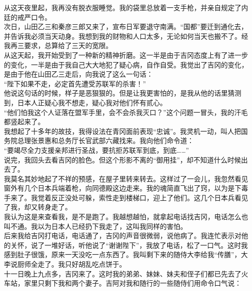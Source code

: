从这天夜里起，我再没有脱衣服睡觉。我的袋里总放着一支手枪，并亲自规定了内廷的戒严口令。\\

次日，山田乙三和秦彦三郎又来了，宣布日军要退守南满。“国都”要迁到通化去，并告诉我必须当天动身。我想到我的财物和人口太多，无论如何当天也搬不了。经我再三要求，总算给了三天的宽限。\\

从这天起，我开始受到了一种新的精神折磨。这一半是由于吉冈态度上有了进一步的变化，一半是由于我自己大大地犯了疑心病，自作自受。我觉出了吉冈的变化，是由于他在山田乙三走后，向我说了这么一句话：\\

“陛下如果不走，必定首先遭受苏联军的杀害！”\\

他说这句话的时候，样子是恶狠狠的。但是让我更害怕的，是我从他的话里猜测到，日本人正疑心我不想走，疑心我对他们怀有贰心。\\

“他们怕我这个人证落在盟军手里，会不会杀我灭口？”这个问题一冒头，我的汗毛都竖起来了。\\

我想起了十多年的故技，我得设法在青冈面前表现“忠诚”。我灵机一动，叫人把国务院总理张景惠和总务厅长官武部六藏找来。我向他们命令道：\\

“要竭尽全力支援亲邦进行圣战，要抗拒苏联军到底，到底……”\\

说完，我回头去看吉冈的脸色。但这个形影不离的“御用挂”，却不知道什么时候出去了。\\

我莫名其妙地起了不祥的预感，在屋子里转来转去。这样过了一会儿，我忽然看见窗外有几个日本兵端着枪，向同德殿这边走来。我的魂简直飞出了窍，以为是下毒手来了。我觉着反正没处可躲，索性走到楼梯口，迎上了他们。这几个日本兵看见了我，却又转身走了。\\

我认为这是来查看我，是不是跑了。我越想越怕，就拿起电话找吉冈，电话怎么也叫不通。我以为日本人已经扔下我走了，这叫我同样的害怕。\\

后来我给吉冈打电话，电话通了，吉冈的声音很微弱，说他病了。我连忙表示对他的关怀，说了一堆好话，听他说了“谢谢陛下”，我放了电话，松了一口气。这时我感到肚子很饿，原来一天没吃一点东西了。我叫剩下来的随侍大李给我“传膳”，大李说厨师全走了。我只好胡乱吃点饼于。\\

十一日晚上九点多，吉冈来了。这时我的弟弟、妹妹、妹夫和侄子们都已先去了火车站，家里只剩下我和两个妻子。吉阿对我和随行的一些随侍们用命令口气说：\\

